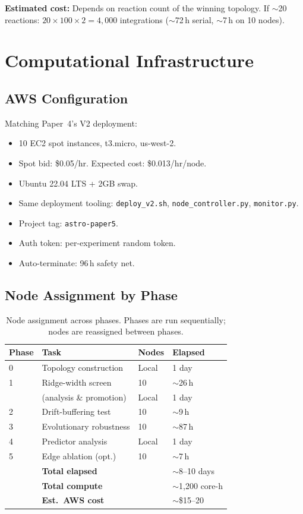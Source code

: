 \documentclass[aps,prl,twocolumn,superscriptaddress,floatfix]{revtex4-2}
\begin{document}
\textbf{Estimated cost:}  Depends on reaction count of the
winning topology.  If $\sim$20 reactions:
$20 \times 100 \times 2 = 4{,}000$ integrations
($\sim$72\,h serial, $\sim$7\,h on 10 nodes).

\section{Computational Infrastructure}
\label{sec:aws}

\subsection{AWS Configuration}

Matching Paper~4's V2 deployment:

\begin{itemize}
  \item 10 EC2 spot instances, t3.micro, us-west-2.
  \item Spot bid: \$0.05/hr.  Expected cost: \$0.013/hr/node.
  \item Ubuntu 22.04 LTS + 2GB swap.
  \item Same deployment tooling: \texttt{deploy\_v2.sh},
    \texttt{node\_controller.py}, \texttt{monitor.py}.
  \item Project tag: \texttt{astro-paper5}.
  \item Auth token: per-experiment random token.
  \item Auto-terminate: 96\,h safety net.
\end{itemize}

\subsection{Node Assignment by Phase}

\begin{table}[h]
\centering
\caption{Node assignment across phases.  Phases are run
sequentially; nodes are reassigned between phases.}
\label{tab:nodes}
\begin{tabular}{llll}
\toprule
Phase & Task & Nodes & Elapsed \\
\midrule
0  & Topology construction  & Local  & 1 day \\
1  & Ridge-width screen     & 10     & $\sim$26\,h \\
   & \quad (analysis \& promotion) & Local & 1 day \\
2  & Drift-buffering test   & 10     & $\sim$9\,h \\
3  & Evolutionary robustness & 10    & $\sim$87\,h \\
4  & Predictor analysis     & Local  & 1 day \\
5  & Edge ablation (opt.)   & 10     & $\sim$7\,h \\
\midrule
   & \textbf{Total elapsed} &        & $\sim$8--10 days \\
   & \textbf{Total compute} &        & $\sim$1{,}200 core-h \\
   & \textbf{Est.\ AWS cost} &       & $\sim$\$15--20 \\
\bottomrule
\end{tabular}
\end{table}
\end{document}

